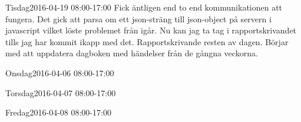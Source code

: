 \documentclass[a4paper,oneside]{book}
\begin{document}
\begin{diary}{Tisdag}{2016-04-19 08:00-17:00}
	Fick äntligen end to end kommunikationen att fungera. Det gick att parsa om ett json-sträng till json-object på servern i javascript vilket löste problemet från igår. Nu kan jag ta tag i rapportskrivandet tills jag har kommit ikapp med det. Rapportskrivande resten av dagen. Börjar med att uppdatera dagboken med händelser från de gångna veckorna.
\end{diary}

\begin{diary}{Onsdag}{2016-04-06 08:00-17:00}

\end{diary}

\begin{diary}{Torsdag}{2016-04-07 08:00-17:00}

\end{diary}

\begin{diary}{Fredag}{2016-04-08 08:00-17:00}

\end{diary}
\end{document}
